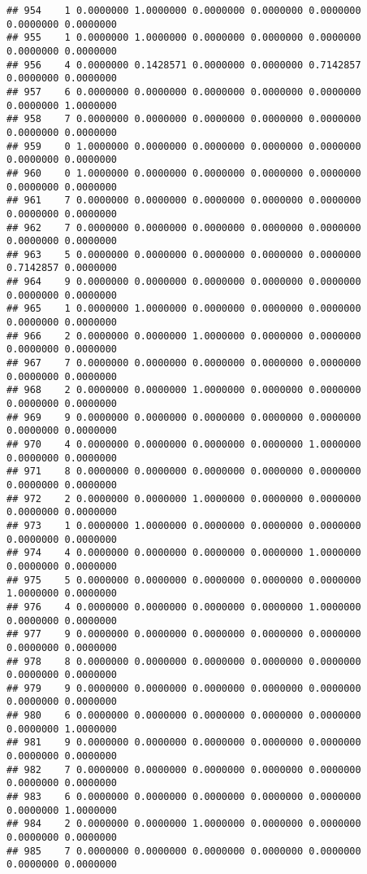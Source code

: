 \documentclass[
]{article}
\begin{document}
\begin{verbatim}
## 954    1 0.0000000 1.0000000 0.0000000 0.0000000 0.0000000 0.0000000 0.0000000
## 955    1 0.0000000 1.0000000 0.0000000 0.0000000 0.0000000 0.0000000 0.0000000
## 956    4 0.0000000 0.1428571 0.0000000 0.0000000 0.7142857 0.0000000 0.0000000
## 957    6 0.0000000 0.0000000 0.0000000 0.0000000 0.0000000 0.0000000 1.0000000
## 958    7 0.0000000 0.0000000 0.0000000 0.0000000 0.0000000 0.0000000 0.0000000
## 959    0 1.0000000 0.0000000 0.0000000 0.0000000 0.0000000 0.0000000 0.0000000
## 960    0 1.0000000 0.0000000 0.0000000 0.0000000 0.0000000 0.0000000 0.0000000
## 961    7 0.0000000 0.0000000 0.0000000 0.0000000 0.0000000 0.0000000 0.0000000
## 962    7 0.0000000 0.0000000 0.0000000 0.0000000 0.0000000 0.0000000 0.0000000
## 963    5 0.0000000 0.0000000 0.0000000 0.0000000 0.0000000 0.7142857 0.0000000
## 964    9 0.0000000 0.0000000 0.0000000 0.0000000 0.0000000 0.0000000 0.0000000
## 965    1 0.0000000 1.0000000 0.0000000 0.0000000 0.0000000 0.0000000 0.0000000
## 966    2 0.0000000 0.0000000 1.0000000 0.0000000 0.0000000 0.0000000 0.0000000
## 967    7 0.0000000 0.0000000 0.0000000 0.0000000 0.0000000 0.0000000 0.0000000
## 968    2 0.0000000 0.0000000 1.0000000 0.0000000 0.0000000 0.0000000 0.0000000
## 969    9 0.0000000 0.0000000 0.0000000 0.0000000 0.0000000 0.0000000 0.0000000
## 970    4 0.0000000 0.0000000 0.0000000 0.0000000 1.0000000 0.0000000 0.0000000
## 971    8 0.0000000 0.0000000 0.0000000 0.0000000 0.0000000 0.0000000 0.0000000
## 972    2 0.0000000 0.0000000 1.0000000 0.0000000 0.0000000 0.0000000 0.0000000
## 973    1 0.0000000 1.0000000 0.0000000 0.0000000 0.0000000 0.0000000 0.0000000
## 974    4 0.0000000 0.0000000 0.0000000 0.0000000 1.0000000 0.0000000 0.0000000
## 975    5 0.0000000 0.0000000 0.0000000 0.0000000 0.0000000 1.0000000 0.0000000
## 976    4 0.0000000 0.0000000 0.0000000 0.0000000 1.0000000 0.0000000 0.0000000
## 977    9 0.0000000 0.0000000 0.0000000 0.0000000 0.0000000 0.0000000 0.0000000
## 978    8 0.0000000 0.0000000 0.0000000 0.0000000 0.0000000 0.0000000 0.0000000
## 979    9 0.0000000 0.0000000 0.0000000 0.0000000 0.0000000 0.0000000 0.0000000
## 980    6 0.0000000 0.0000000 0.0000000 0.0000000 0.0000000 0.0000000 1.0000000
## 981    9 0.0000000 0.0000000 0.0000000 0.0000000 0.0000000 0.0000000 0.0000000
## 982    7 0.0000000 0.0000000 0.0000000 0.0000000 0.0000000 0.0000000 0.0000000
## 983    6 0.0000000 0.0000000 0.0000000 0.0000000 0.0000000 0.0000000 1.0000000
## 984    2 0.0000000 0.0000000 1.0000000 0.0000000 0.0000000 0.0000000 0.0000000
## 985    7 0.0000000 0.0000000 0.0000000 0.0000000 0.0000000 0.0000000 0.0000000

\end{verbatim}
\end{document}
